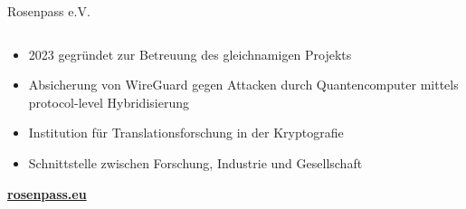 \begin{frame}{Rosenpass e.V.}
  \begin{columns}[fullwidth,c]

    \begin{column}{.7\linewidth}
      \begin{itemize}
        \item 2023 gegründet zur Betreuung des gleichnamigen Projekts
        \vfill
        \item Absicherung von WireGuard gegen Attacken durch Quantencomputer mittels protocol-level Hybridisierung
        \item Institution für Translationsforschung in der Kryptografie
        \vfill
        \item Schnittstelle zwischen Forschung, Industrie und Gesellschaft
      \end{itemize}
      \bigskip
      \textbf{\url{rosenpass.eu}}
    \end{column}%
  \end{columns}
\end{frame}
